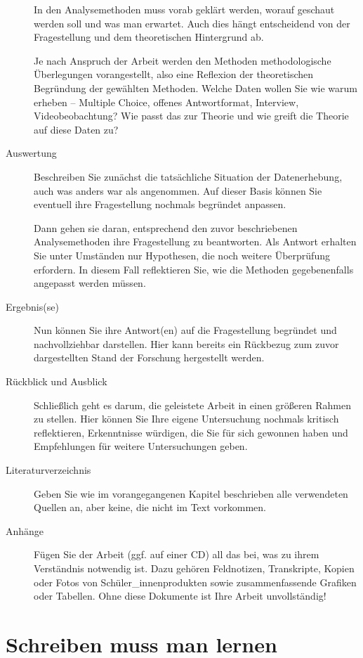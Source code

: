 \documentclass[ngerman,oneside,12pt,a4paper]{scrbook}
\begin{document}
\begin{description}
In den Analysemethoden muss vorab geklärt werden, worauf geschaut werden
soll und was man erwartet. Auch dies hängt entscheidend von der
Fragestellung und dem theoretischen Hintergrund ab.

Je nach Anspruch der Arbeit werden den Methoden methodologische
Überlegungen vorangestellt, also eine Reflexion der theoretischen
Begründung der gewählten Methoden. Welche Daten wollen Sie wie warum
erheben -- Multiple Choice, offenes Antwortformat, Interview,
Videobeobachtung? Wie passt das zur Theorie und wie greift die Theorie
auf diese Daten zu?
\item[Auswertung]
Beschreiben Sie zunächst die tatsächliche Situation der Datenerhebung,
auch was anders war als angenommen. Auf dieser Basis können Sie
eventuell ihre Fragestellung nochmals begründet anpassen.

Dann gehen sie daran, entsprechend den zuvor beschriebenen
Analysemethoden ihre Fragestellung zu beantworten. Als Antwort erhalten
Sie unter Umständen nur Hypothesen, die noch weitere Überprüfung
erfordern. In diesem Fall reflektieren Sie, wie die Methoden
gegebenenfalls angepasst werden müssen.
\item[Ergebnis(se)]
Nun können Sie ihre Antwort(en) auf die Fragestellung begründet und
nachvollziehbar darstellen. Hier kann bereits ein Rückbezug zum zuvor
dargestellten Stand der Forschung hergestellt werden.
\item[Rückblick und Ausblick]
Schließlich geht es darum, die geleistete Arbeit in einen größeren
Rahmen zu stellen. Hier können Sie Ihre eigene Untersuchung nochmals
kritisch reflektieren, Erkenntnisse würdigen, die Sie für sich gewonnen
haben und Empfehlungen für weitere Untersuchungen geben.
\item[Literaturverzeichnis]
Geben Sie wie im vorangegangenen Kapitel beschrieben alle verwendeten
Quellen an, aber keine, die nicht im Text vorkommen.
\item[Anhänge]
Fügen Sie der Arbeit (ggf. auf einer CD) all das bei, was zu ihrem
Verständnis notwendig ist. Dazu gehören Feldnotizen, Transkripte, Kopien
oder Fotos von Schüler\_innenprodukten sowie zusammenfassende Grafiken
oder Tabellen. Ohne diese Dokumente ist Ihre Arbeit unvollständig!
\end{description}

\section{Schreiben muss man lernen}\label{schreiben-muss-man-lernen}
\end{document}
